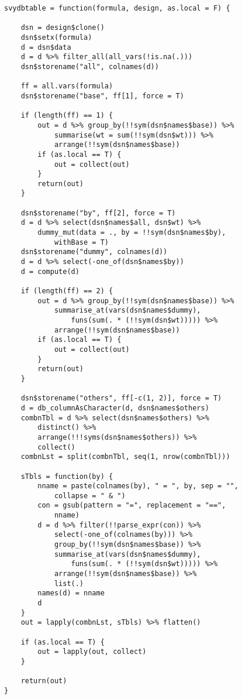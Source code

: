 \begin{lstlisting}
svydbtable = function(formula, design, as.local = F) {
    
    dsn = design$clone()
    dsn$setx(formula)
    d = dsn$data
    d = d %>% filter_all(all_vars(!is.na(.)))
    dsn$storename("all", colnames(d))
    
    ff = all.vars(formula)
    dsn$storename("base", ff[1], force = T)
    
    if (length(ff) == 1) {
        out = d %>% group_by(!!sym(dsn$names$base)) %>% 
            summarise(wt = sum(!!sym(dsn$wt))) %>% 
            arrange(!!sym(dsn$names$base))
        if (as.local == T) {
            out = collect(out)
        }
        return(out)
    }
    
    dsn$storename("by", ff[2], force = T)
    d = d %>% select(dsn$names$all, dsn$wt) %>% 
        dummy_mut(data = ., by = !!sym(dsn$names$by), 
            withBase = T)
    dsn$storename("dummy", colnames(d))
    d = d %>% select(-one_of(dsn$names$by))
    d = compute(d)
    
    if (length(ff) == 2) {
        out = d %>% group_by(!!sym(dsn$names$base)) %>% 
            summarise_at(vars(dsn$names$dummy), 
                funs(sum(. * (!!sym(dsn$wt))))) %>% 
            arrange(!!sym(dsn$names$base))
        if (as.local == T) {
            out = collect(out)
        }
        return(out)
    }
    
    dsn$storename("others", ff[-c(1, 2)], force = T)
    d = db_columnAsCharacter(d, dsn$names$others)
    combnTbl = d %>% select(dsn$names$others) %>% 
        distinct() %>% 
        arrange(!!!syms(dsn$names$others)) %>% 
        collect()
    combnLst = split(combnTbl, seq(1, nrow(combnTbl)))
    
    sTbls = function(by) {
        nname = paste(colnames(by), " = ", by, sep = "",
            collapse = " & ")
        con = gsub(pattern = "=", replacement = "==", 
            nname)
        d = d %>% filter(!!parse_expr(con)) %>% 
            select(-one_of(colnames(by))) %>% 
            group_by(!!sym(dsn$names$base)) %>% 
            summarise_at(vars(dsn$names$dummy), 
                funs(sum(. * (!!sym(dsn$wt))))) %>% 
            arrange(!!sym(dsn$names$base)) %>% 
            list(.)
        names(d) = nname
        d
    }
    out = lapply(combnLst, sTbls) %>% flatten()
    
    if (as.local == T) {
        out = lapply(out, collect)
    }
    
    return(out)
}
\end{lstlisting}

